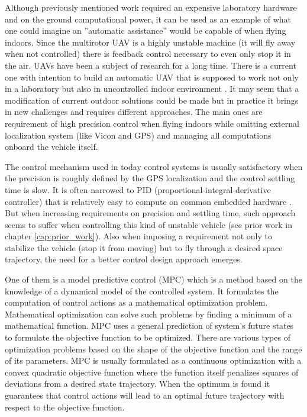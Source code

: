 Although previously mentioned work required an expensive laboratory hardware and on the ground computational power, it can be used as an example of what one could imagine an ''automatic assistance'' would be capable of when flying indoors. Since the multirotor UAV is a highly unstable machine (it will fly away when not controlled) there is feedback control necessary to even only stop it in the air. UAVs have been a subject of research for a long time. There is a current one with intention to build an automatic UAV that is supposed to work not only in a laboratory but also in uncontrolled indoor environment \citep{alexis2014rmpc}. It may seem that a modification of current outdoor solutions could be made but in practice it brings in new challenges and requires different approaches. The main ones are requirement of high precision control when flying indoors while omitting external localization system (like Vicon and GPS) and managing all computations onboard the vehicle itself.

The control mechanism used in today control systems is usually satisfactory when the precision is roughly defined by the GPS localization and the control settling time is slow. It is often narrowed to PID (proportional-integral-derivative controller) that is relatively easy to compute on common embedded hardware \cite{pixhawk, ardupilot}. But when increasing requirements on precision and settling time, such approach seems to suffer when controlling this kind of unstable vehicle (see prior work in chapter \ref{cap:prior_work}). Also when imposing a requirement not only to stabilize the vehicle (stop it   from moving) but to fly through a desired space trajectory, the need for a better control design approach emerges.

One of them is a model predictive control (MPC) which is a method based on the knowledge of a dynamical model of the controlled system. It formulates the computation of control actions as a mathematical optimization problem. Mathematical optimization can solve such problems by finding a minimum of a mathematical function. MPC uses a general prediction of system's future states to formulate the objective function to be optimized. There are various types of optimization problems based on the shape of the objective function and the range of its parameters. MPC is usually formulated as a continuous optimization with a convex quadratic objective function where the function itself penalizes squares of deviations from a desired state trajectory. When the optimum is found it guarantees that control actions will lead to an optimal future trajectory with respect to the objective function.

